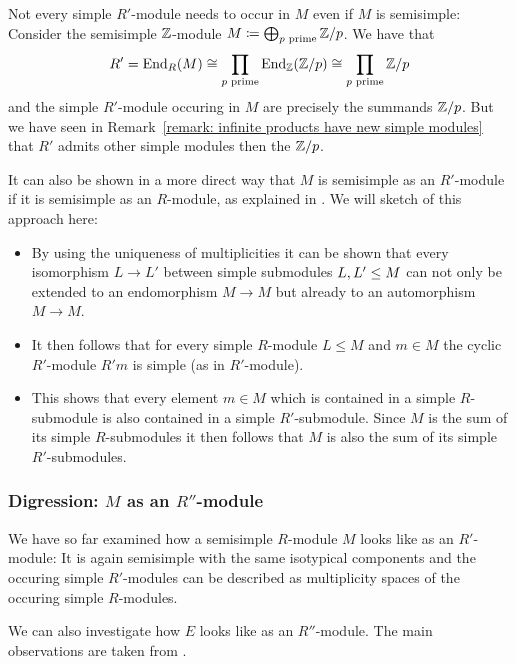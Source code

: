 \begin{warning}
  Not every simple $R'$-module needs to occur in $M$ even if $M$ is semisimple:
  Consider the semisimple $\mathbb{Z}$-module $M \coloneqq \bigoplus_{\text{$p$ prime}} \mathbb{Z}/p$.
  We have that
  \[
          R'
    =     \operatorname{End}_R(M)
    \cong \prod_{\text{$p$ prime}} \operatorname{End}_{\mathbb{Z}}(\mathbb{Z}/p)
    \cong \prod_{\text{$p$ prime}} \mathbb{Z}/p
  \]
  and the simple $R'$-module occuring in $M$ are precisely the summands $\mathbb{Z}/p$.
  But we have seen in Remark~\ref*{remark: infinite products have new simple modules} that $R'$ admits other simple modules then the $\mathbb{Z}/p$.
\end{warning}


\begin{remark}
  It can also be shown in a more direct way that $M$ is semisimple as an $R'$-module if it is semisimple as an $R$-module, as explained in \cite[Chapter~IV, Section~2,Theorems~6,7,8]{Behrens1972Ring}.
  We will sketch of this approach here:
  \begin{itemize}
    \item
      By using the uniqueness of multiplicities it can be shown that every isomorphism $L \to L'$ between simple submodules $L, L' \leq M$ can not only be extended to an endomorphism $M \to M$ but already to an automorphism $M \to M$.
    \item
      It then follows that for every simple $R$-module $L \leq M$ and $m \in M$ the cyclic $R'$-module $R' m$ is simple (as in $R'$-module).
    \item
      This shows that every element $m \in M$ which is contained in a simple $R$-submodule is also contained in a simple $R'$-submodule.
      Since $M$ is the sum of its simple $R$-submodules it then follows that $M$ is also the sum of its simple $R'$-submodules.
  \end{itemize}
\end{remark}





\subsubsection{Digression: $M$ as an $R''$-module}

\begin{fluff}
  We have so far examined how a semisimple $R$-module $M$ looks like as an $R'$-module:
  It is again semisimple with the same isotypical components and the occuring simple $R'$-modules can be described as multiplicity spaces of the occuring simple $R$-modules.
  
  We can also investigate how $E$ looks like as an $R''$-module.
  The main observations are taken from \cite[Chapter~2.6]{DaSilva2017NonCommutative}.
\end{fluff}


